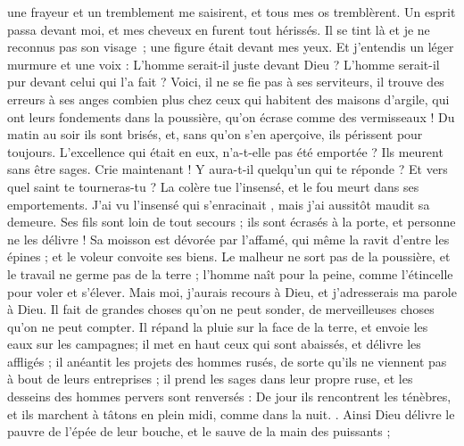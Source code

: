 \begin{multicols}{2}
une frayeur et un tremblement me saisirent, et tous mes os tremblèrent.
Un esprit passa devant moi, et mes cheveux en furent tout hérissés. 
Il se tint là et je ne reconnus pas son visage ; une figure était devant mes yeux. Et j'entendis un léger murmure et une voix :
L'homme serait-il juste devant Dieu ? L'homme serait-il pur devant celui qui l'a fait ?
Voici, il ne se fie pas à ses serviteurs, il trouve des erreurs à ses anges
combien plus chez ceux qui habitent des maisons d'argile, qui ont leurs fondements dans la poussière, qu'on écrase comme des vermisseaux !
Du matin au soir ils sont brisés, et, sans qu'on s'en aperçoive, ils périssent pour toujours. 
L'excellence qui était en eux, n'a-t-elle pas été emportée ? Ils meurent sans être sages. 
\VerseOne{}Crie maintenant ! Y aura-t-il quelqu'un qui te réponde ? Et vers quel saint te tourneras-tu ?
La colère tue l'insensé, et le fou meurt dans ses emportements.
J'ai vu l'insensé qui s'enracinait , mais j'ai aussitôt maudit sa demeure.
Ses fils sont loin de tout secours ; ils sont écrasés à la porte, et personne ne les délivre !
 Sa moisson est dévorée par l'affamé, qui même la ravit d'entre les épines ; et le voleur convoite ses biens.
Le malheur ne sort pas de la poussière, et le travail ne germe pas de la terre ;
l'homme naît pour la peine, comme l'étincelle pour voler et s'élever.
Mais moi, j'aurais recours à Dieu, et j'adresserais ma parole à Dieu.
Il fait de grandes choses qu'on ne peut sonder, de merveilleuses choses qu'on ne peut compter.
Il répand la pluie sur la face de la terre, et envoie les eaux sur les campagnes;
il met en haut ceux qui sont abaissés, et délivre les affligés ;
il anéantit les projets des hommes rusés, de sorte qu'ils ne viennent pas à bout de leurs entreprises ;
il prend les sages dans leur propre ruse, et les desseins des hommes pervers sont renversés :
De jour ils rencontrent les ténèbres, et ils marchent à tâtons en plein midi, comme dans la nuit.
.
Ainsi Dieu délivre le pauvre de l'épée de leur bouche, et le sauve de la main des puissants ;

\end{multicols}
